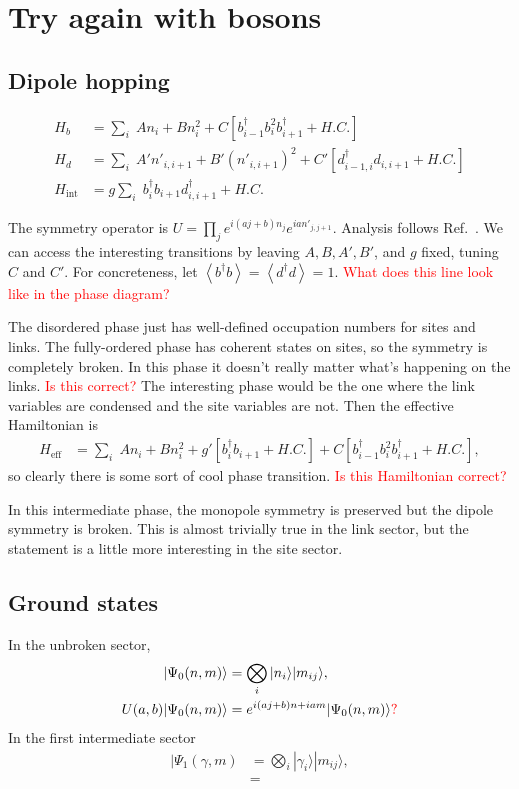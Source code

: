 \documentclass[12pt]{article}
\newcommand{\note}[1]{\textcolor{red}{#1}}
\newcommand{\nn}{\nonumber\\}
\renewcommand{\int}{\text{int}}
\newcommand{\ex}[1]{\left\langle#1\right\rangle}
\begin{document}
\section{Try again with bosons}

\subsection{Dipole hopping}

\begin{align}
H_b &= \sum_i \; A  n_i + B n_i^2 + C \left[ b^{\dag}_{i-1} b_i^2 b^{\dag}_{i+1} + H.C. \right]\nn
H_d &= \sum_i \; A' n'_{i,i+1} + B' (n'_{i,i+1})^2 + C' \left[d^{\dag}_{i-1,i} d_{i,i+1} +H.C.\right]\nn
H_{\int} &= g \sum_i \; b^{\dag}_i b_{i+1} d^{\dag}_{i,i+1} + H.C. 
\end{align}

The symmetry operator is $U = \prod_je^{i(aj+b)n_j}e^{ian'_{j,j+1}}$. Analysis follows Ref.~\cite{Chen2018}. We can access the interesting transitions by leaving $A, B, A', B'$, and $g$ fixed, tuning $C$ and $C'$. For concreteness, let $\ex{b^\dag b}=\ex{d^\dag d}=1$. \note{What does this line look like in the phase diagram?} 

The disordered phase just has well-defined occupation numbers for sites and links. The fully-ordered phase has coherent states on sites, so the symmetry is completely broken. In this phase it doesn't really matter what's happening on the links. \note{Is this correct?} The interesting phase would be the one where the link variables are condensed and the site variables are not. Then the effective Hamiltonian is
\begin{align}
H_\text{eff} &= \sum_i\; A  n_i + B n_i^2 + g' \left[b_i^\dag b_{i+1} +H.C.\right] + C \left[ b^{\dag}_{i-1} b_i^2 b^{\dag}_{i+1} + H.C. \right],
\end{align}
so clearly there is some sort of cool phase transition. \note{Is this Hamiltonian correct?}

In this intermediate phase, the monopole symmetry is preserved but the dipole symmetry is broken. This is almost trivially true in the link sector, but the statement is a little more interesting in the site sector.

\subsection{Ground states}

In the unbroken sector,
\begin{align}
|\Psi_0(n,m)\rangle &= \bigotimes_{i}|n_i\rangle |m_{ij} \rangle, \nn
U(a,b)|\Psi_0(n,m)\rangle &= e^{i(aj+b)n+iam} |\Psi_0(n,m) \rangle \note{?}
\end{align}
In the first intermediate sector
\begin{align}
|\Psi_1(\gamma,m) &= \bigotimes_{i}|\gamma_i\rangle |m_{ij} \rangle, \nn
&= 
\end{align}
\end{document}
